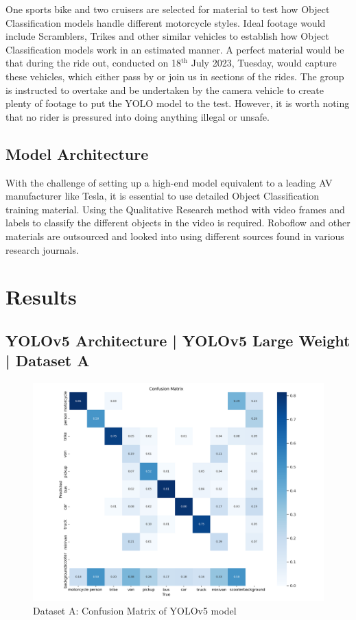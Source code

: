 \documentclass[conference]{IEEEtran}
\begin{document}
		One sports bike and two cruisers are selected for material to test how Object Classification models handle different motorcycle styles. Ideal footage would include Scramblers, Trikes and other similar vehicles to establish how Object Classification models work in an estimated manner. A perfect material would be that during the ride out, conducted on 18$^\text{th}$ July 2023, Tuesday, would capture these vehicles, which either pass by or join us in sections of the rides. The group is instructed to overtake and be undertaken by the camera vehicle to create plenty of footage to put the YOLO model to the test. However, it is worth noting that no rider is pressured into doing anything illegal or unsafe.

	\subsection{Model Architecture}
		With the challenge of setting up a high-end model equivalent to a leading AV manufacturer like Tesla, it is essential to use detailed Object Classification training material. Using the Qualitative Research method with video frames and labels to classify the different objects in the video is required. Roboflow and other materials are outsourced and looked into using different sources found in various research journals.

\section{Results}
	\subsection{YOLOv5 Architecture | YOLOv5 Large Weight | Dataset A}
		\begin{figure}[h]
			\centering
			\includegraphics[width=\columnwidth]{Figures/a_confusion_matrix.png}
			\caption{Dataset A: Confusion Matrix of YOLOv5 model}
			\label{fig:ukDatasetYolov5LargeWeight}
		\end{figure}
\end{document}
